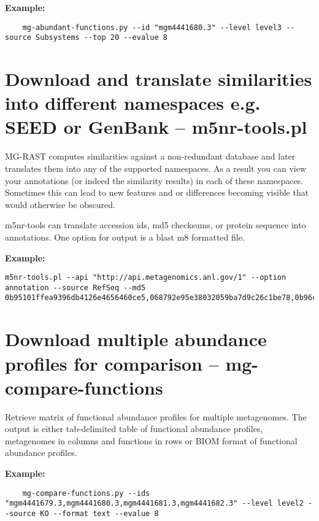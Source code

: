 \textbf{Example:}
\begin{lstlisting}
    mg-abundant-functions.py --id "mgm4441680.3" --level level3 --source Subsystems --top 20 --evalue 8
\end{lstlisting}
\section{Download and translate similarities into different namespaces e.g. SEED or GenBank -- m5nr-tools.pl}

MG-RAST computes similarities against a non-redundant database \cite{M5NR} and later translates them into any of the supported namespaces. As a result you can view your annotations (or indeed the similarity results) in each of these namespaces. Sometimes this can lead to new features and or differences becoming visible that would otherwise be obscured.

m5nr-tools can translate accession ids, md5 checksums, or protein sequence into annotations. 
One option for output is a blast m8 formatted file.


\textbf{Example:}
\begin{lstlisting}
m5nr-tools.pl --api "http://api.metagenomics.anl.gov/1" --option annotation --source RefSeq --md5 0b95101ffea9396db4126e4656460ce5,068792e95e38032059ba7d9c26c1be78,0b96c92ce600d8b2427eedbc221642f1
\end{lstlisting}

\section{Download multiple abundance profiles for comparison --  mg-compare-functions}

Retrieve matrix of functional abundance profiles for multiple metagenomes.
The output is either  tab-delimited table of functional abundance profiles, metagenomes in columns and functions in rows or BIOM format of functional abundance profiles.

\textbf{Example:}
\begin{lstlisting}
    mg-compare-functions.py --ids "mgm4441679.3,mgm4441680.3,mgm4441681.3,mgm4441682.3" --level level2 --source KO --format text --evalue 8
\end{lstlisting}





